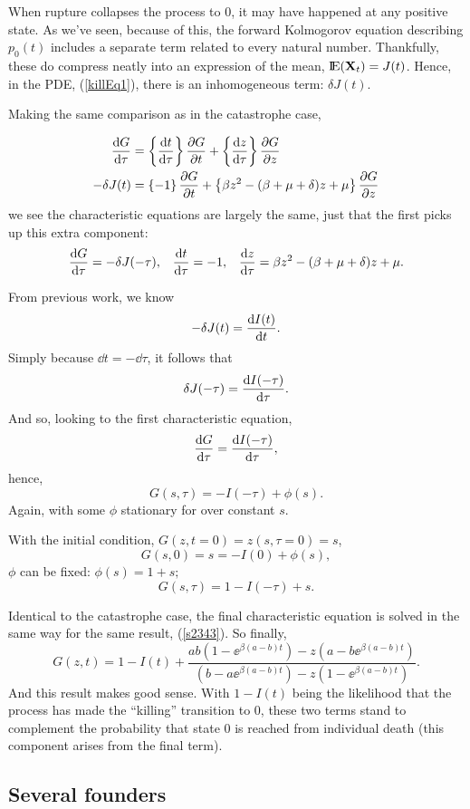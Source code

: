 When rupture collapses the process to 0, it may have happened at any positive state.  As we've seen, because of this, the forward Kolmogorov equation describing $p_0(t)$ includes a separate term related to every natural number. Thankfully, these do compress neatly into an expression of the mean, ${\rm I}\!{\rm E}({{\bf X}_t}) = J(t)$. Hence, in the PDE, (\ref{killEq1}), there is an inhomogeneous term: $\delta J(t)$.\par
Making the same comparison as in the catastrophe case, 

\begin{align*}
\displaystyle\frac{{\rm d} G}{{\rm d} \tau} &=  \left\{\displaystyle\frac{{\rm d} t}{{\rm d} \tau}\right\}  \displaystyle\frac{\partial G}{\partial t}+ \left\{\displaystyle\frac{{\rm d} z}{{\rm d} \tau} \right\}\displaystyle\frac{\partial G}{\partial z}\\
-\delta J(t)&=  \left\{- 1\right\}\displaystyle\frac{\partial G}{\partial t} + \left\{\beta z^2 -( \beta + \mu + \delta)z + \mu\right\} \displaystyle\frac{\partial G}{\partial z}
\end{align*}
we see the characteristic equations are largely the same, just that the first picks up this extra component: 
\begin{align*}
\label{Char2}
\displaystyle\frac{{\rm d} G}{{\rm d} \tau} = -\delta J(-\tau),&& \displaystyle\frac{{\rm d} t}{{\rm d} \tau} = -1, && \displaystyle\frac{{\rm d} z}{{\rm d} \tau} = \beta z^2 - (\beta + \mu + \delta)z + \mu.
\end{align*}



\noindent
From previous work, we know 
$$-\delta J(t) = \displaystyle\frac{{\rm d} I(t)}{{\rm d} t}.$$
Simply because $\dd t = -\dd \tau$, it follows that 
$$\delta J(-\tau) = \displaystyle\frac{{\rm d} I(-\tau)}{{\rm d} \tau}.$$
And so, looking to the first characteristic equation, 
$$\displaystyle\frac{{\rm d} G}{{\rm d} \tau} = \displaystyle\frac{{\rm d} I(-\tau)}{{\rm d} \tau},$$
hence,
$$G(s,\tau) = -I(-\tau) + \phi(s).$$
Again, with some $\phi$ stationary for over constant $s$. \par
With the initial condition, $G(z, t=0) = z(s, \tau = 0) = s$,
$$G(s,0) =s= -I(0) + \phi(s),$$
$\phi$ can be fixed: $\phi(s) = 1 + s;$
$$G(s,\tau) = 1 - I(-\tau) + s.$$\par
Identical to the catastrophe case, the final characteristic equation is solved in the same way for the same result, (\ref{s2343}). So finally,
$$G(z,t) = 1 - I(t)  + \frac{ab(1-\ee^{\beta(a-b) t}) - z(a-b\ee^{\beta(a-b) t}) } {  (b-a\ee^{\beta(a-b) t}) -z(1-\ee^{\beta(a-b) t})  }.$$
And this result makes good sense. With $1 - I(t)$ being the likelihood that the process has made the ``killing'' transition to 0, these two terms stand to complement the probability that state $0$ is reached from individual death (this component arises from the final term).

\subsection{Several founders}
\label{sec:pgf-k-founders}

